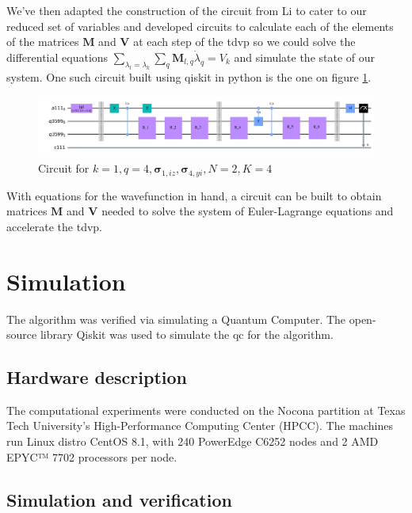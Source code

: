 \documentclass{aux/ttuthes2007}
\newcommand{\elec}{N}
\newcommand{\orb}{K}
\begin{document}
We've then adapted the construction of the circuit from Li  to cater to our reduced set of variables and developed circuits to calculate each of the elements of the matrices $\bm M$ and $\bm V$ at each step of the \gls{tdvp} so we could solve the differential equations $\sum_{\lambda_l = \lambda_k} \sum_q \bm M_{l,q}\dot{\lambda}_q = V_k$ and simulate the state of our system. One such circuit built using qiskit in python is the one on figure \ref{fig:circuit}. 
\begin{figure}[hb!]
  \includegraphics[width=\linewidth]{img/circuit.jpg}
  \caption{Circuit for $k = 1, q = 4, \bm \sigma_{1, iz}, \bm \sigma_{4, yi}, \elec = 2, \orb = 4$}
  \label{fig:circuit}
\end{figure}

With equations for the wavefunction in hand, a circuit can be built to obtain matrices $\bm M$ and $\bm V$ needed to solve the system of Euler-Lagrange equations and accelerate the \gls{tdvp}.

\section{\textbf{Simulation}}

The algorithm was verified via simulating a Quantum Computer. The open-source library Qiskit was used to simulate the \gls{qc} for the algorithm.

\subsection{\textbf{Hardware description}}
The computational experiments were conducted on the Nocona partition at Texas Tech University's High-Performance Computing Center (HPCC). The machines run Linux distro CentOS 8.1, with 240 PowerEdge C6252 nodes and 2 AMD EPYC™ 7702 processors per node.
%

\subsection{\textbf{Simulation and verification}}
\end{document}
